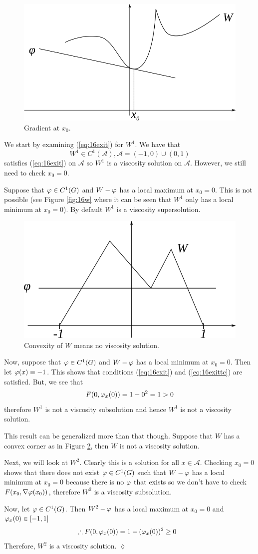 \begin{figure}[ht!]
	\centering
	\includegraphics[width=.4\textwidth]{images/16x0}
	\caption{Gradient at $x_0$.}
	\label{fig:16x0}
\end{figure}

\begin{example}
We start by examining (\ref{eq:16exit}) for $W^1$. We have that
$$W^1\in C^1(\mathcal{A}), \mathcal{A}=(-1,0)\cup(0,1)$$
satisfies (\ref{eq:16exit}) on $\mathcal{A}$ so $W^1$ is a viscosity solution on $\mathcal{A}$. However, we still need to check $x_0=0$.

Suppose that $\varphi\in C^1(G)$ and $W-\varphi$ has a local maximum at $x_0=0$. This is not possible (see Figure \ref{fig:16w} where it can be seen that $W^1$ only has a local minimum at $x_0=0$). By default $W^1$ is a viscosity supersolution.

\begin{figure}[ht!]
	\centering
	\includegraphics[width=.4\textwidth]{images/16vs}
	\caption{Convexity of $W$ means no viscosity solution.}
	\label{fig:16vs}
\end{figure}

Now, suppose that $\varphi\in C^1(G)$ and $W-\varphi$ has a local minimum at $x_0=0$. Then let $\varphi(x)\equiv-1$. This shows that conditions (\ref{eq:16exit}) and (\ref{eq:16exittc}) are satisfied. But, we see that
$$F(0,\varphi_x(0))=1-0^2=1>0$$
therefore $W^1$ is not a viscosity subsolution and hence $W^1$ is not a viscosity solution.

This result can be generalized more than that though. Suppose that $W$ has a convex corner as in Figure \ref{fig:16vs}, then $W$ is not a viscosity solution.

Next, we will look at $W^2$. Clearly this is a solution for all $x\in\mathcal{A}$. Checking $x_0=0$ shows that there does not exist $\varphi\in C^1(G)$ such that $W-\varphi$ has a local minimum at $x_0=0$ because there is no $\varphi$ that exists so we don't have to check $F(x_0,\nabla\varphi(x_0))$, therefore $W^2$ is a viscosity subsolution.

Now, let $\varphi\in C^1(G)$. Then $W^2-\varphi$ has a local maximum at $x_0=0$ and $\varphi_x(0)\in[-1,1]$
\begin{align*}
&\therefore F(0,\varphi_x(0)) = 1-(\varphi_x(0))^2\geq0
\end{align*}
Therefore, $W^2$ is a viscosity solution.
$\lozenge$
\end{example}

